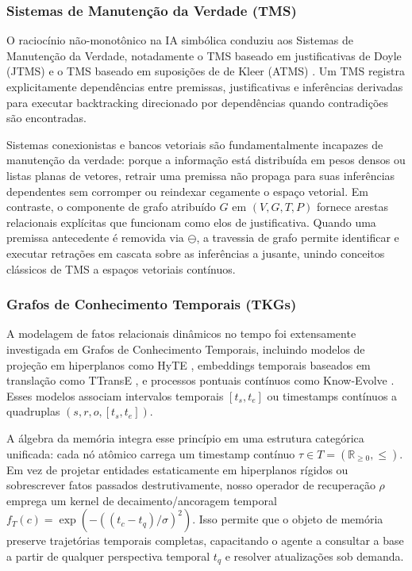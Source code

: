 \documentclass[11pt,a4paper]{article}
\theoremstyle{definition}
\begin{document}
\subsubsection{Sistemas de Manuten\c{c}\~ao da Verdade (TMS)}
O racioc\'inio n\~ao-monot\^onico na IA simb\'olica conduziu aos Sistemas de Manuten\c{c}\~ao da Verdade, notadamente o TMS baseado em justificativas de Doyle (JTMS) \cite{doyle1979truth} e o TMS baseado em suposi\c{c}\~oes de de Kleer (ATMS) \cite{dekleer1986assumption}. Um TMS registra explicitamente depend\^encias entre premissas, justificativas e infer\^encias derivadas para executar backtracking direcionado por depend\^encias quando contradi\c{c}\~oes s\~ao encontradas.

Sistemas conexionistas e bancos vetoriais s\~ao fundamentalmente incapazes de manuten\c{c}\~ao da verdade: porque a informa\c{c}\~ao est\'a distribu\'ida em pesos densos ou listas planas de vetores, retrair uma premissa n\~ao propaga para suas infer\^encias dependentes sem corromper ou reindexar cegamente o espa\c{c}o vetorial. Em contraste, o componente de grafo atribu\'ido $G$ em $(V, G, T, P)$ fornece arestas relacionais expl\'icitas que funcionam como elos de justificativa. Quando uma premissa antecedente \'e removida via $\ominus$, a travessia de grafo permite identificar e executar retra\c{c}\~oes em cascata sobre as infer\^encias a jusante, unindo conceitos cl\'assicos de TMS a espa\c{c}os vetoriais cont\'inuos.

\subsubsection{Grafos de Conhecimento Temporais (TKGs)}
A modelagem de fatos relacionais din\^amicos no tempo foi extensamente investigada em Grafos de Conhecimento Temporais, incluindo modelos de proje\c{c}\~ao em hiperplanos como HyTE \cite{dasgupta2018hyte}, embeddings temporais baseados em transla\c{c}\~ao como TTransE \cite{leblay2018deriving}, e processos pontuais cont\'inuos como Know-Evolve \cite{trivedi2017know}. Esses modelos associam intervalos temporais $[t_s, t_e]$ ou timestamps cont\'inuos a quadruplas $(s, r, o, [t_s, t_e])$.

A \'algebra da mem\'oria integra esse princ\'ipio em uma estrutura categ\'orica unificada: cada n\'o at\^omico carrega um timestamp cont\'inuo $\tau \in T = (\mathbb{R}_{\geq 0}, \leq)$. Em vez de projetar entidades estaticamente em hiperplanos r\'igidos ou sobrescrever fatos passados destrutivamente, nosso operador de recupera\c{c}\~ao $\rho$ emprega um kernel de decaimento/ancoragem temporal $f_T(c) = \exp(-((t_c - t_q)/\sigma)^2)$. Isso permite que o objeto de mem\'oria preserve trajet\'orias temporais completas, capacitando o agente a consultar a base a partir de qualquer perspectiva temporal $t_q$ e resolver atualiza\c{c}\~oes sob demanda.
\end{document}
